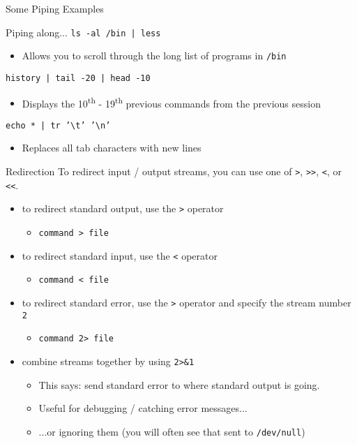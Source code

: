 \documentclass[11pt]{beamer}
\newcommand{\tsup}{\textsuperscript}                        %
\begin{document}
\begin{frame}[fragile]{Some Piping Examples}
  \begin{block}{Piping along...}
    \texttt{ls -al /bin | less}
    \begin{itemize}
      \item Allows you to scroll through the long list of programs in \texttt{/bin}
    \end{itemize}
    \texttt{history | tail -20 | head -10}
    \begin{itemize}
      \item Displays the 10\tsup{th} \-- 19\tsup{th} previous commands from the previous session
    \end{itemize}
    \texttt{echo * | tr '\textbackslash t' '\textbackslash n'}
    \begin{itemize}
      \item Replaces all tab characters with new lines
    \end{itemize}
  \end{block}
\end{frame}

\begin{frame}[fragile]{Redirection}
  To redirect input / output streams, you can use one of \texttt{>}, \texttt{>>}, \texttt{<}, or \texttt{<<}.
  \begin{itemize}[<+- | alert@+>]
    \item to redirect standard output, use the \texttt{>} operator
    \begin{itemize}[<+- | alert@+>]
      \item \texttt{command > file}
    \end{itemize}
    \item to redirect standard input, use the \texttt{<} operator
    \begin{itemize}[<+- | alert@+>]
      \item \texttt{command < file}
    \end{itemize}
    \item to redirect standard error, use the \texttt{>} operator and specify the stream number \texttt{2}
    \begin{itemize}[<+- | alert@+>]
      \item \texttt{command 2> file}
    \end{itemize}
    \item combine streams together by using \texttt{2>\&1}
    \begin{itemize}
      \item This says: send standard error to where standard output is going.
      \item Useful for debugging / catching error messages...
      \item ...or ignoring them (you will often see that sent to \texttt{/dev/null})
    \end{itemize}
  \end{itemize}
\end{frame}
\end{document}
